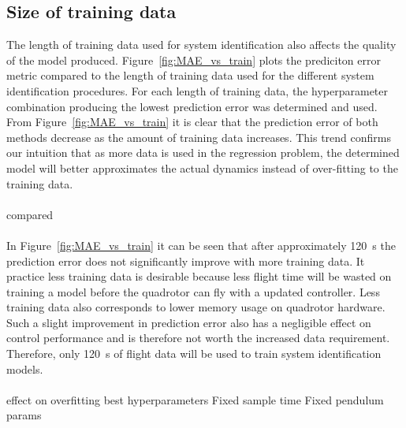     \subsection{Size of training data}
        The length of training data used for system identification also affects the quality of the model produced.
        Figure~\ref{fig:MAE_vs_train} plots the prediciton error metric compared to the length of training data used for the different system identification procedures.
        For each length of training data, the hyperparameter combination producing the lowest prediction error was determined and used.
        From Figure~\ref{fig:MAE_vs_train} it is clear that the prediction error of both methods decrease as the amount of training data increases.
        This trend confirms our intuition that as more data is used in the regression problem, 
        the determined model will better approximates the actual dynamics instead of over-fitting to the training data.
        
        

        \paragraph{}
        compared

        \paragraph{}
        In Figure~\ref{fig:MAE_vs_train} it can be seen that after approximately \SI{120}{\second} 
        the prediction error does not significantly improve with more training data.
        It practice less training data is desirable because less flight time will be wasted on training a model before the quadrotor can fly with a updated controller.
        Less training data also corresponds to lower memory usage on quadrotor hardware.
        Such a slight improvement in prediction error also has a negligible effect on control performance and is therefore not worth the increased data requirement.
        Therefore, only \SI{120}{\second} of flight data will be used to train system identification models. 
        
        \paragraph{}

        effect on overfitting
        best hyperparameters
        Fixed sample time
        Fixed pendulum params
    
